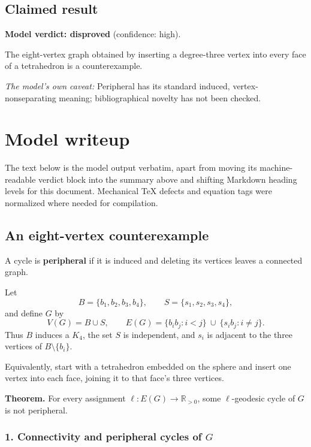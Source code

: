 \documentclass[
  11pt,
  a4paper,
]{article}
\begin{document}
\subsection{Claimed result}\label{claimed-result}

\textbf{Model verdict: disproved} (confidence: high).

The eight-vertex graph obtained by inserting a degree-three vertex into
every face of a tetrahedron is a counterexample.

\emph{The model's own caveat:} Peripheral has its standard induced,
vertex-nonseparating meaning; bibliographical novelty has not been
checked.

\section{Model writeup}\label{model-writeup}

The text below is the model output verbatim, apart from moving its
machine-readable verdict block into the summary above and shifting
Markdown heading levels for this document. Mechanical TeX defects and
equation tags were normalized where needed for compilation.

\subsection{An eight-vertex
counterexample}\label{an-eight-vertex-counterexample}

A cycle is \textbf{peripheral} if it is induced and deleting its
vertices leaves a connected graph.

Let \[
B=\{b_1,b_2,b_3,b_4\},\qquad S=\{s_1,s_2,s_3,s_4\},
\] and define \(G\) by \[
V(G)=B\cup S,\qquad
E(G)=\{b_ib_j:i<j\}\ \cup\ \{s_i b_j:i\ne j\}.
\] Thus \(B\) induces a \(K_4\), the set \(S\) is independent, and
\(s_i\) is adjacent to the three vertices of \(B\setminus\{b_i\}\).

Equivalently, start with a tetrahedron embedded on the sphere and insert
one vertex into each face, joining it to that face's three vertices.

\textbf{Theorem.} For every assignment \(\ell:E(G)\to\mathbb R_{>0}\),
some \(\ell\)-geodesic cycle of \(G\) is not peripheral.

\subsubsection{\texorpdfstring{1. Connectivity and peripheral cycles of
\(G\)}{1. Connectivity and peripheral cycles of G}}\label{connectivity-and-peripheral-cycles-of-g}
\end{document}
